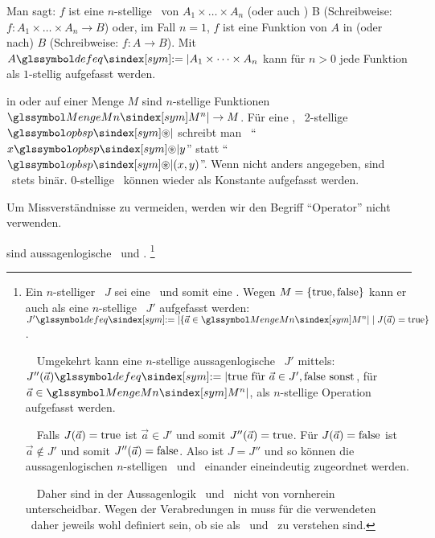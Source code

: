 \begin{description}
	Man sagt: $f$ ist eine $n$-stellige \Funktion\ von $A_1 \times \dots \times A_n$  (oder auch ) B (Schreibweise: $f : A_1 \times \dots \times A_n \rightarrow B$) oder, im Fall $n=1$, $f$ ist eine Funktion von $A$ in (oder nach) $B$ (Schreibweise: $f : A \rightarrow B$). Mit $A \symdefeq A_1 \times \dots \times A_n$ kann für $n > 0$ jede Funktion als $1$-stellig aufgefasst werden.

	\item [\Operationen] in oder auf einer Menge $M$ sind $n$-stellige Funktionen $\symMengeMn \rightarrow M$.
	Für eine , \textdh\ 2-stellige \Operation\ $\symopbsp$ schreibt man \textiAlg\ \enquote{$x \symopbsp y$} statt \enquote{$\symopbsp(x,y)$}.
	Wenn nicht anders angegeben, sind \Operationen\ stets binär.
	0-stellige \Operationen\ können wieder als Konstante aufgefasst werden.

	Um Missverständnisse zu vermeiden, werden wir den Begriff \enquote{Operator} nicht verwenden.

	\item [\Junktoren] sind aussagenlogische \Relationen\ und \Operationen.%
	\footnote{\label{def:Junktor}%
		Ein $n$-stelliger \Junktor\ $J$ sei eine \Operation\ und somit eine \Funktion.
		Wegen $M = \{\mathrm{true},\mathrm{false}\}$ kann er auch als eine $n$-stellige \Relation\ $J'$ aufgefasst werden:
		$J' \symdefeq \{\vec{a} \in \symMengeMn \mid J(\vec{a}) = \true\}$.

		~~Umgekehrt kann eine $n$-stellige aussagenlogische \Relation\ $J'$ mittels:
		$J''(\vec{a}) \symdefeq \true \text{ für } \vec{a} \in J', \false \text{ sonst}$, für $\vec{a} \in \symMengeMn$, als $n$-stellige Operation aufgefasst werden.

		~~Falls $J(\vec{a})=\mathrm{true}$ ist $\vec{a} \in J'$ und somit $J''(\vec{a})=\mathrm{true}$.
		Für $J(\vec{a})=\mathrm{false}$ ist $\vec{a} \notin J'$ und somit $J''(\vec{a})=\mathrm{false}$.
		Also ist $J=J''$ und so können die aussagenlogischen $n$-stelligen \Relationen\ und \Operationen\ einander eineindeutig zugeordnet werden.

		~~Daher sind in der Aussagenlogik \Relationen\ und \Operationen\ nicht von vornherein unterscheidbar.
		Wegen der Verabredungen in  muss für die verwendeten \Junktoren\ daher jeweils wohl definiert sein, ob sie als \Relation\ und \Operation\ zu verstehen sind.
	}
\end{description}


